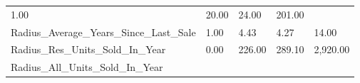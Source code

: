 \documentclass[]{article}
\begin{document}
\begin{longtable}[]{@{}lllll@{}}
\begin{minipage}[t]{0.08\columnwidth}
1.00\strut
\end{minipage} & \begin{minipage}[t]{0.09\columnwidth}\raggedright\strut
20.00\strut
\end{minipage} & \begin{minipage}[t]{0.09\columnwidth}\raggedright\strut
24.00\strut
\end{minipage} & \begin{minipage}[t]{0.11\columnwidth}\raggedright\strut
201.00\strut
\end{minipage}\tabularnewline
\begin{minipage}[t]{0.49\columnwidth}\raggedright\strut
Radius\_Average\_Years\_Since\_Last\_Sale\strut
\end{minipage} & \begin{minipage}[t]{0.08\columnwidth}\raggedright\strut
1.00\strut
\end{minipage} & \begin{minipage}[t]{0.09\columnwidth}\raggedright\strut
4.43\strut
\end{minipage} & \begin{minipage}[t]{0.09\columnwidth}\raggedright\strut
4.27\strut
\end{minipage} & \begin{minipage}[t]{0.11\columnwidth}\raggedright\strut
14.00\strut
\end{minipage}\tabularnewline
\begin{minipage}[t]{0.49\columnwidth}\raggedright\strut
Radius\_Res\_Units\_Sold\_In\_Year\strut
\end{minipage} & \begin{minipage}[t]{0.08\columnwidth}\raggedright\strut
0.00\strut
\end{minipage} & \begin{minipage}[t]{0.09\columnwidth}\raggedright\strut
226.00\strut
\end{minipage} & \begin{minipage}[t]{0.09\columnwidth}\raggedright\strut
289.10\strut
\end{minipage} & \begin{minipage}[t]{0.11\columnwidth}\raggedright\strut
2,920.00\strut
\end{minipage}\tabularnewline
\begin{minipage}[t]{0.49\columnwidth}\raggedright\strut
Radius\_All\_Units\_Sold\_In\_Year\strut
\end{minipage} & \begin{minipage}[t]{0.08\columnwidth}\raggedright\strut

\end{minipage}
\end{longtable}
\end{document}
